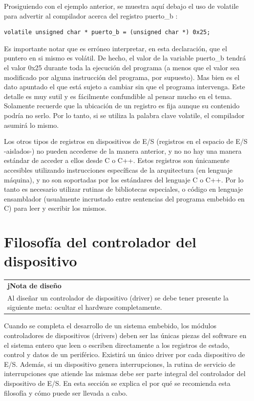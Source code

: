 \documentclass[output=paper, 
colorlinks,
citecolor=brown,
newtxmath
]{langscibook}
\begin{document}
Prosiguiendo con el ejemplo anterior, se muestra aquí debajo el uso 
de volatile para advertir al compilador acerca del registro puerto\_b :

\begin{verbatim}
volatile unsigned char * puerto_b = (unsigned char *) 0x25;
\end{verbatim}

Es importante notar que es erróneo interpretar, en esta declaración,
que el puntero en si mismo es volátil. De hecho, el valor de la
variable puerto\_b tendrá el valor 0x25 durante toda la ejecución del programa
(a menos que el valor sea modificado por alguna instrucción del programa, por
supuesto). Mas bien es el dato apuntado el que está sujeto a cambiar
sin que el programa intervenga. Este detalle es muy sutil y es fácilmente
confundible al pensar mucho en el tema. Solamente recuerde que la ubicación
de un registro es fija aunque su contenido podría no serlo. Por lo tanto, si se
utiliza la palabra clave volatile, el compilador asumirá lo mismo.

Los otros tipos de registros en dispositivos de E/S (registros en el espacio
de E/S -aislados-) no pueden accederse de la manera anterior, y no
no hay una manera estándar de acceder a ellos desde C o C++. 
Estos registros son únicamente accesibles utilizando instrucciones específicas
de la arquitectura (en lenguaje máquina), y no son soportadas por los 
estándares del lenguaje C o C++. Por lo tanto
es necesario utilizar rutinas de bibliotecas especiales, o código en lenguaje
ensamblador (usualmente incrustado entre sentencias del programa embebido en C)
para leer y escribir los mismos.


\section {Filosofía del controlador del dispositivo}

\begin{center}
\begin{tabularx}{\textwidth}{|X|}
\hline
\rowcolor{aliceblue}
\textbf{jNota de diseño}\\
Al diseñar un controlador de dispositivo (driver) se debe
tener presente la siguiente meta: ocultar el hardware completamente.\\
\hline
\end{tabularx}
\end{center}


Cuando se completa el desarrollo de un sistema embebido, los módulos
controladores de dispositivos (drivers) deben
ser las únicas piezas del software en el sistema entero que leen o escriben 
directamente a los registros de estado, control y datos de un periférico. 
Existirá un único driver por cada dispositivo de E/S.
Además, si un dispositivo genera interrupciones, la rutina de servicio 
de interrupciones que atiende las mismas debe ser parte integral 
del controlador del dispositivo de E/S.
En esta sección se explica el por qué se recomienda esta filosofía y cómo
puede ser llevada a cabo.
\end{document}
